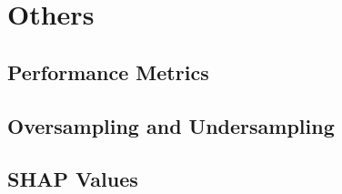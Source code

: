 \section{Others}

\subsection{Performance Metrics} 

\subsection{Oversampling and Undersampling}

\subsection{SHAP Values}

